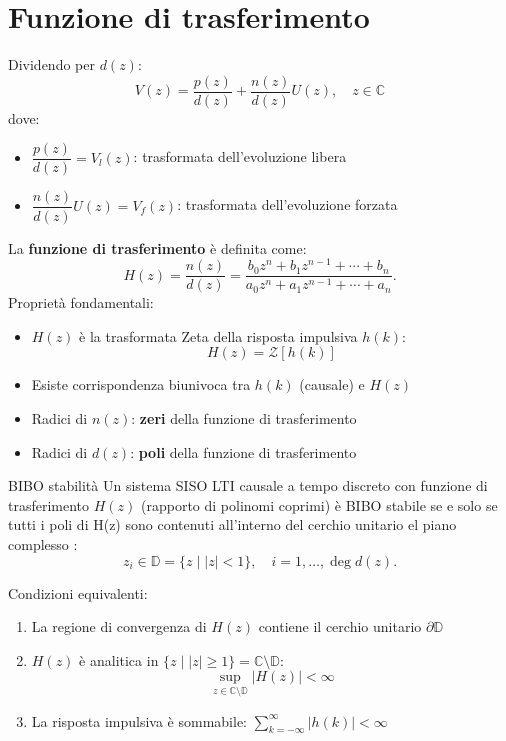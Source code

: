 \documentclass{article}
\theoremstyle{definition}
\begin{document}
\section{Funzione di trasferimento}
Dividendo per \(d(z)\):
\[
V(z) = \frac{p(z)}{d(z)} + \frac{n(z)}{d(z)} U(z), \quad z \in \mathbb{C}
\]
dove:
\begin{itemize}
	\item \(\dfrac{p(z)}{d(z)} = V_l(z)\): trasformata dell'evoluzione libera
	\item \(\dfrac{n(z)}{d(z)} U(z) = V_f(z)\): trasformata dell'evoluzione forzata
\end{itemize}
La \textbf{funzione di trasferimento} è definita come:
\[
H(z) = \frac{n(z)}{d(z)} = \frac{b_0 z^n + b_1 z^{n-1} + \cdots + b_n}{a_0 z^n + a_1 z^{n-1} + \cdots + a_n}.
\]
Proprietà fondamentali:
\begin{itemize}
	\item \(H(z)\) è la trasformata Zeta della risposta impulsiva \(h(k)\): 
	\[
	H(z) = \mathcal{Z}[h(k)]
	\]
	\item Esiste corrispondenza biunivoca tra \(h(k)\) (causale) e \(H(z)\)
	\item Radici di \(n(z)\): \textbf{zeri} della funzione di trasferimento
	\item Radici di \(d(z)\): \textbf{poli} della funzione di trasferimento
\end{itemize}

\begin{teo}{BIBO stabilità}{}
	Un sistema SISO LTI causale a tempo discreto con funzione di trasferimento \(H(z)\) (rapporto di polinomi coprimi) è BIBO stabile se e solo se tutti i poli di H(z) sono contenuti all'interno del cerchio unitario el piano complesso  :
	\[
 z_i \in \mathbb{D} = \{z \mid |z| < 1\}, \quad i = 1,\ldots,\deg d(z).
	\]
\end{teo}
Condizioni equivalenti:
\begin{enumerate}
	\item La regione di convergenza di \(H(z)\) contiene il cerchio unitario \(\partial\mathbb{D}\)
	\item \(H(z)\) è analitica in \(\{z \mid |z| \geq 1\} = \mathbb{C}\setminus\mathbb{D}\):
	\[
	\sup_{z \in \mathbb{C}\setminus\mathbb{D}} |H(z)| < \infty
	\]
	\item La risposta impulsiva è sommabile: \(\sum_{k=-\infty}^{\infty} |h(k)| < \infty\)
\end{enumerate}
\end{document}
